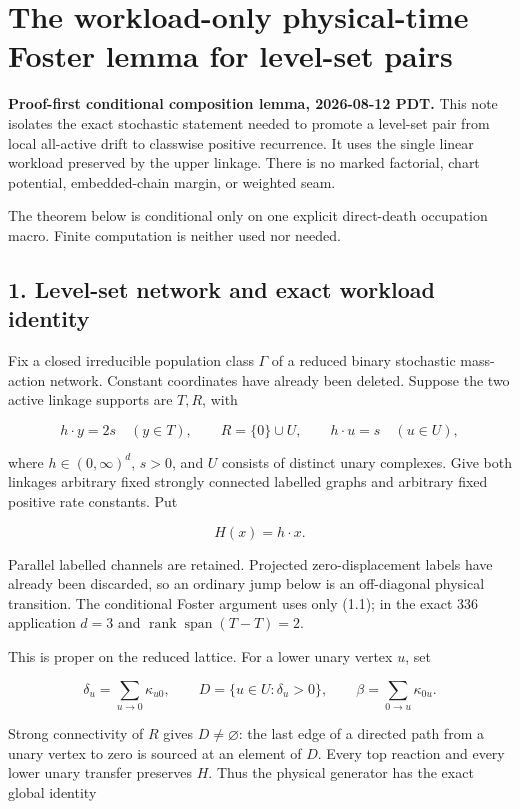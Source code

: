 \section{The workload-only physical-time Foster lemma for level-set
pairs}

\textbf{Proof-first conditional composition lemma, 2026-08-12 PDT.} This
note isolates the exact stochastic statement needed to promote a
level-set pair from local all-active drift to classwise positive
recurrence. It uses the single linear workload preserved by the upper
linkage. There is no marked factorial, chart potential, embedded-chain
margin, or weighted seam.

The theorem below is conditional only on one explicit direct-death
occupation macro. Finite computation is neither used nor needed.

\subsection{1. Level-set network and exact workload
identity}

Fix a closed irreducible population class \(\Gamma\) of a reduced binary
stochastic mass-action network. Constant coordinates have already been
deleted. Suppose the two active linkage supports are \(T,R\), with

\[
 h\cdot y=2s\quad(y\in T),\qquad
 R=\{0\}\cup U,\qquad h\cdot u=s\quad(u\in U),          \tag{1.1}
\]

where \(h\in(0,\infty)^d\), \(s>0\), and \(U\) consists of distinct
unary complexes. Give both linkages arbitrary fixed strongly connected
labelled graphs and arbitrary fixed positive rate constants. Put

\[
                              H(x)=h\cdot x.             \tag{1.2}
\]

Parallel labelled channels are retained. Projected zero-displacement
labels have already been discarded, so an ordinary jump below is an
off-diagonal physical transition. The conditional Foster argument uses
only (1.1); in the exact 336 application \(d=3\) and
\(\operatorname{rank}\operatorname{span}(T-T)=2\).

This is proper on the reduced lattice. For a lower unary vertex \(u\),
set

\[
 \delta_u=\sum_{u\to0}\kappa_{u0},\qquad
 D=\{u\in U:\delta_u>0\},\qquad
 \beta=\sum_{0\to u}\kappa_{0u}.                       \tag{1.3}
\]

Strong connectivity of \(R\) gives \(D\ne\varnothing\): the last edge of
a directed path from a unary vertex to zero is sourced at an element of
\(D\). Every top reaction and every lower unary transfer preserves
\(H\). Thus the physical generator has the exact global identity

